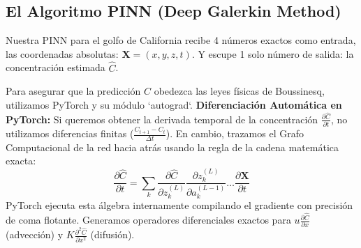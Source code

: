 \documentclass[11pt,a4paper]{article}
\begin{document}
\subsection{El Algoritmo PINN (Deep Galerkin Method)}
Nuestra PINN para el golfo de California recibe 4 números exactos como entrada, las coordenadas absolutas: $\mathbf{X} = (x, y, z, t)$. Y escupe 1 solo número de salida: la concentración estimada $\hat{C}$.

Para asegurar que la predicción $\hat{C}$ obedezca las leyes físicas de Boussinesq, utilizamos PyTorch y su módulo `autograd`.
\textbf{Diferenciación Automática en PyTorch:}
Si queremos obtener la derivada temporal de la concentración $\frac{\partial \hat{C}}{\partial t}$, no utilizamos diferencias finitas ($\frac{C_{t+1} - C_t}{\Delta t}$). En cambio, trazamos el Grafo Computacional de la red hacia atrás usando la regla de la cadena matemática exacta:
\begin{equation}
\frac{\partial \hat{C}}{\partial t} = \sum_{k} \frac{\partial \hat{C}}{\partial z^{(L)}_k} \frac{\partial z^{(L)}_k}{\partial a^{(L-1)}_k} \dots \frac{\partial \mathbf{X}}{\partial t}
\end{equation}
PyTorch ejecuta esta álgebra internamente compilando el gradiente con precisión de coma flotante. Generamos operadores diferenciales exactos para $u\frac{\partial \hat{C}}{\partial x}$ (advección) y $K\frac{\partial^2 \hat{C}}{\partial x^2}$ (difusión).
\end{document}
